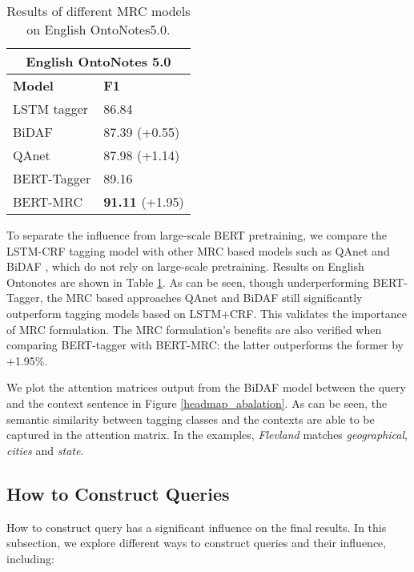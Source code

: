 \documentclass[11pt,a4paper]{article}
\begin{document}
\begin{table}
\small
\center
\begin{tabular}{ll}\toprule
\multicolumn{2}{c}{{\bf English OntoNotes 5.0}}\\\midrule
{\bf Model} & {\bf F1} \\\midrule
LSTM tagger \cite{dilatedcnn} & 86.84 \\
BiDAF \cite{bidaf}  & 87.39 (+0.55) \\ 
QAnet \cite{qanet} &  87.98  (+1.14) \\ \hline
BERT-Tagger & 89.16 \\
BERT-MRC & {\bf 91.11} (+1.95) \\\bottomrule
\end{tabular}
\caption{Results of different MRC models on English OntoNotes5.0.}
\label{ablation-query-1}
\end{table}

To separate the influence from large-scale BERT pretraining, we compare the LSTM-CRF tagging model \cite{dilatedcnn} with other MRC based models such as QAnet \cite{qanet}
and BiDAF \cite{bidaf}, which do not rely on large-scale pretraining. 
Results on English Ontonotes   are shown in Table \ref{ablation-query-1}. 
As can be seen, though underperforming BERT-Tagger, 
the MRC based approaches 
QAnet and BiDAF still significantly outperform tagging models based on LSTM+CRF. This validates the 
importance of MRC formulation.
The MRC formulation's benefits are also verified when comparing BERT-tagger with  BERT-MRC: the latter outperforms the former by +1.95\%. 

We plot 
the attention matrices output from the BiDAF model between the query and the context sentence in 
 Figure \ref{headmap_abalation}. 
 As can be seen, the semantic similarity between tagging classes and the contexts are able to be captured in the  attention matrix. In the examples, {\em Flevland} matches {\em geographical}, {\em cities} and {\em state}.





\subsection{How to Construct Queries} 
\label{query strategy}
How to construct query has a significant influence on the final results. 
In this subsection, we explore different ways to construct queries and their influence, including:
\end{document}
